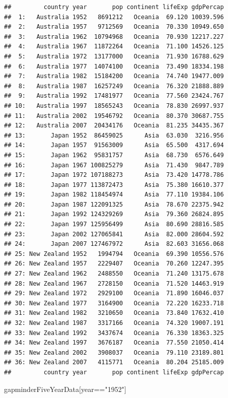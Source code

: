 \documentclass[]{article}
\newenvironment{Shaded}{\begin{snugshade}}{\end{snugshade}}
\newcommand{\StringTok}[1]{\textcolor[rgb]{0.31,0.60,0.02}{{#1}}}
\newcommand{\NormalTok}[1]{{#1}}
\begin{document}
\begin{verbatim}
##         country year       pop continent lifeExp gdpPercap
##  1:   Australia 1952   8691212   Oceania  69.120 10039.596
##  2:   Australia 1957   9712569   Oceania  70.330 10949.650
##  3:   Australia 1962  10794968   Oceania  70.930 12217.227
##  4:   Australia 1967  11872264   Oceania  71.100 14526.125
##  5:   Australia 1972  13177000   Oceania  71.930 16788.629
##  6:   Australia 1977  14074100   Oceania  73.490 18334.198
##  7:   Australia 1982  15184200   Oceania  74.740 19477.009
##  8:   Australia 1987  16257249   Oceania  76.320 21888.889
##  9:   Australia 1992  17481977   Oceania  77.560 23424.767
## 10:   Australia 1997  18565243   Oceania  78.830 26997.937
## 11:   Australia 2002  19546792   Oceania  80.370 30687.755
## 12:   Australia 2007  20434176   Oceania  81.235 34435.367
## 13:       Japan 1952  86459025      Asia  63.030  3216.956
## 14:       Japan 1957  91563009      Asia  65.500  4317.694
## 15:       Japan 1962  95831757      Asia  68.730  6576.649
## 16:       Japan 1967 100825279      Asia  71.430  9847.789
## 17:       Japan 1972 107188273      Asia  73.420 14778.786
## 18:       Japan 1977 113872473      Asia  75.380 16610.377
## 19:       Japan 1982 118454974      Asia  77.110 19384.106
## 20:       Japan 1987 122091325      Asia  78.670 22375.942
## 21:       Japan 1992 124329269      Asia  79.360 26824.895
## 22:       Japan 1997 125956499      Asia  80.690 28816.585
## 23:       Japan 2002 127065841      Asia  82.000 28604.592
## 24:       Japan 2007 127467972      Asia  82.603 31656.068
## 25: New Zealand 1952   1994794   Oceania  69.390 10556.576
## 26: New Zealand 1957   2229407   Oceania  70.260 12247.395
## 27: New Zealand 1962   2488550   Oceania  71.240 13175.678
## 28: New Zealand 1967   2728150   Oceania  71.520 14463.919
## 29: New Zealand 1972   2929100   Oceania  71.890 16046.037
## 30: New Zealand 1977   3164900   Oceania  72.220 16233.718
## 31: New Zealand 1982   3210650   Oceania  73.840 17632.410
## 32: New Zealand 1987   3317166   Oceania  74.320 19007.191
## 33: New Zealand 1992   3437674   Oceania  76.330 18363.325
## 34: New Zealand 1997   3676187   Oceania  77.550 21050.414
## 35: New Zealand 2002   3908037   Oceania  79.110 23189.801
## 36: New Zealand 2007   4115771   Oceania  80.204 25185.009
##         country year       pop continent lifeExp gdpPercap
\end{verbatim}

\begin{Shaded}
\begin{Highlighting}[]
\NormalTok{gapminderFiveYearData[year==}\StringTok{"1952"}\NormalTok{]}
\end{Highlighting}
\end{Shaded}
\end{document}
